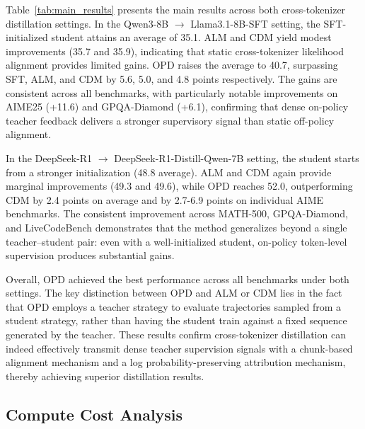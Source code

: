 \documentclass{article}
\theoremstyle{plain}
\theoremstyle{definition}
\theoremstyle{remark}
\begin{document}
Table~\ref{tab:main_results} presents the main results across both cross-tokenizer distillation settings. In the Qwen3-8B $\rightarrow$ Llama3.1-8B-SFT setting, the SFT-initialized student attains an average of 35.1. ALM and CDM yield modest improvements (35.7 and 35.9), indicating that static cross-tokenizer likelihood alignment provides limited gains. OPD raises the average to 40.7, surpassing SFT, ALM, and CDM by 5.6, 5.0, and 4.8 points respectively. The gains are consistent across all benchmarks, with particularly notable improvements on AIME25 (+11.6) and GPQA-Diamond (+6.1), confirming that dense on-policy teacher feedback delivers a stronger supervisory signal than static off-policy alignment.

In the DeepSeek-R1 $\rightarrow$ DeepSeek-R1-Distill-Qwen-7B setting, the student starts from a stronger initialization (48.8 average). ALM and CDM again provide marginal improvements (49.3 and 49.6), while OPD reaches 52.0, outperforming CDM by 2.4 points on average and by 2.7-6.9 points on individual AIME benchmarks. The consistent improvement across MATH-500, GPQA-Diamond, and LiveCodeBench demonstrates that the method generalizes beyond a single teacher--student pair: even with a well-initialized student, on-policy token-level supervision produces substantial gains.

Overall, OPD achieved the best performance across all benchmarks under both settings. The key distinction between OPD and ALM or CDM lies in the fact that OPD employs a teacher strategy to evaluate trajectories sampled from a student strategy, rather than having the student train against a fixed sequence generated by the teacher. These results confirm cross-tokenizer distillation can indeed effectively transmit dense teacher supervision signals with a chunk-based alignment mechanism and a log probability-preserving attribution mechanism, thereby achieving superior distillation results.





\subsection{Compute Cost Analysis}
\label{sec:compute_cost}
\end{document}
